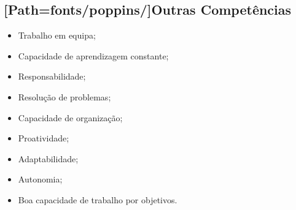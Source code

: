 \vspace{5pt}

\subsection*{[Path=fonts/poppins/]Outras Competências}

\begin{minipage}[t]{0.5\textwidth}
	\begin{itemize}
		\item Trabalho em equipa;
		\item Capacidade de aprendizagem constante;
		\item Responsabilidade;
		\item Resolução de problemas;
		\item Capacidade de organização;
	\end{itemize}
\end{minipage}
\begin{minipage}[t]{0.5\textwidth}
	\begin{itemize}
		\item Proatividade;
		\item Adaptabilidade;
		\item Autonomia;
		\item Boa capacidade de trabalho por objetivos.
	\end{itemize}
\end{minipage}

\vspace{5pt}